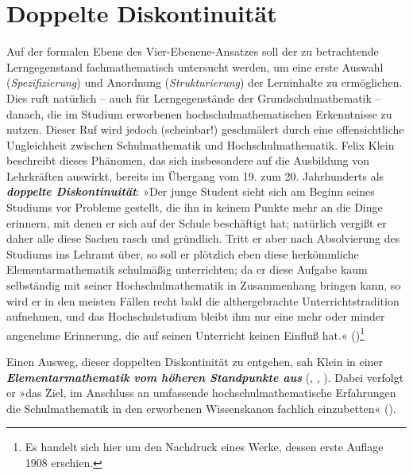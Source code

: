 \documentclass[
]{scrbook}
\theoremstyle{definition}
\theoremstyle{definition}
\theoremstyle{definition}
\theoremstyle{definition}
\theoremstyle{remark}
\begin{document}
\section{Doppelte Diskontinuität}\label{doppelte-diskontinuituxe4t}

Auf der \textcolor{formalColor}{formalen Ebene} des Vier-Ebenene-Ansatzes soll der zu betrachtende Lerngegenstand fachmathematisch untersucht werden, um eine erste Auswahl (\emph{Spezifizierung}) und Anordnung (\emph{Strukturierung}) der Lerninhalte zu ermöglichen. Dies ruft natürlich -- auch für Lerngegenstände der Grundschulmathematik -- danach, die im Studium erworbenen hochschulmathematischen Erkenntnisse zu nutzen. Dieser Ruf wird jedoch (scheinbar!) geschmälert durch eine offensichtliche Ungleichheit zwischen Schulmathematik und Hochschulmathematik. Felix Klein beschreibt dieses Phänomen, das sich insbesondere auf die Ausbildung von Lehrkräften auswirkt, bereits im Übergang vom 19. zum 20. Jahrhunderts als \textbf{\emph{doppelte Diskontinuität}}: »Der junge Student sieht sich am Beginn seines Studiums vor Probleme gestellt, die ihn in keinem Punkte mehr an die Dinge erinnern, mit denen er sich auf der Schule beschäftigt hat; natürlich vergißt er daher alle diese Sachen rasch und gründlich. Tritt er aber nach Absolvierung des Studiums ins Lehramt über, so soll er plötzlich eben diese herkömmliche Elementarmathematik schulmäßig unterrichten; da er diese Aufgabe kaum selbständig mit seiner Hochschulmathematik in Zusammenhang bringen kann, so wird er in den meisten Fällen recht bald die althergebrachte Unterrichtstradition aufnehmen, und das Hochschulstudium bleibt ihm nur eine mehr oder minder angenehme Erinnerung, die auf seinen Unterricht keinen Einfluß hat.« ()\footnote{Es handelt sich hier um den Nachdruck eines Werke, dessen erste Auflage 1908 erschien.}

Einen Ausweg, dieser doppelten Diskontinität zu entgehen, sah Klein in einer \textbf{\emph{Elementarmathematik vom höheren Standpunkte aus}} (, , ). Dabei verfolgt er »das Ziel, im Anschluss an umfassende hochschulmathematische Erfahrungen die Schulmathematik in den erworbenen Wissenskanon fachlich einzubetten« ().
\end{document}
